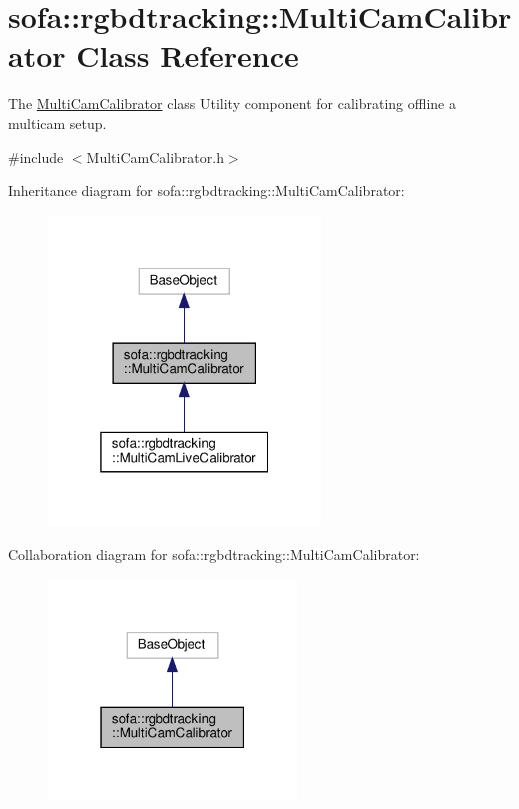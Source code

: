 \hypertarget{classsofa_1_1rgbdtracking_1_1_multi_cam_calibrator}{}\section{sofa\+:\+:rgbdtracking\+:\+:Multi\+Cam\+Calibrator Class Reference}
\label{classsofa_1_1rgbdtracking_1_1_multi_cam_calibrator}


The \hyperlink{classsofa_1_1rgbdtracking_1_1_multi_cam_calibrator}{Multi\+Cam\+Calibrator} class Utility component for calibrating offline a multicam setup.  




{\ttfamily \#include $<$Multi\+Cam\+Calibrator.\+h$>$}



Inheritance diagram for sofa\+:\+:rgbdtracking\+:\+:Multi\+Cam\+Calibrator\+:
\nopagebreak
\begin{figure}[H]
\begin{center}
\leavevmode
\includegraphics[width=205pt]{classsofa_1_1rgbdtracking_1_1_multi_cam_calibrator__inherit__graph}
\end{center}
\end{figure}


Collaboration diagram for sofa\+:\+:rgbdtracking\+:\+:Multi\+Cam\+Calibrator\+:
\nopagebreak
\begin{figure}[H]
\begin{center}
\leavevmode
\includegraphics[width=187pt]{classsofa_1_1rgbdtracking_1_1_multi_cam_calibrator__coll__graph}
\end{center}
\end{figure}

